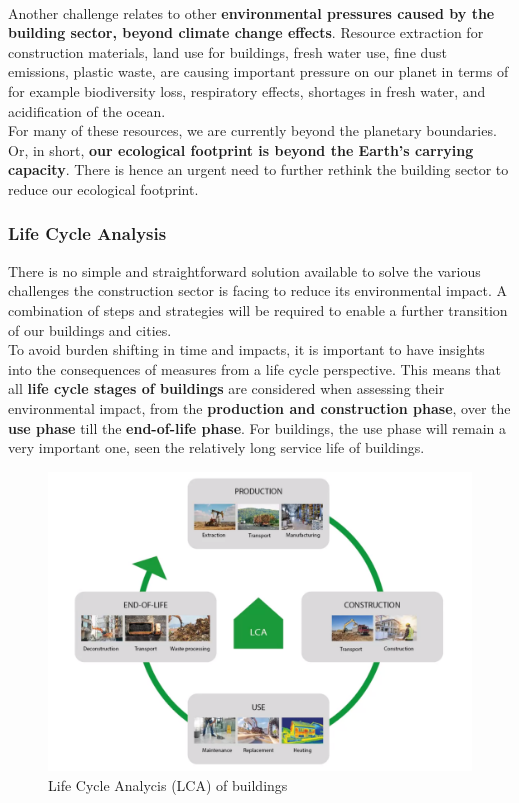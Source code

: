 \documentclass[../summary.tex]{subfiles}
\begin{document}
	\ \\
	Another challenge relates to other \textbf{environmental pressures caused by the building sector, beyond climate change effects}. Resource extraction for construction materials, land use for buildings, fresh water use, fine dust emissions, plastic waste, are causing important pressure on our planet in terms of for example biodiversity loss, respiratory effects, shortages in fresh water, and acidification of the ocean. 
	\\
	For many of these resources, we are currently beyond the planetary boundaries. Or, in short, \textbf{our ecological footprint is beyond the Earth’s carrying capacity}. There is hence an urgent need to further rethink the building sector to reduce our ecological footprint. 
	
	\subsubsection{Life Cycle Analysis}
	
	There is no simple and straightforward solution available to solve the various challenges the construction sector is facing to reduce its environmental impact. A combination of steps and strategies will be required to enable a further transition of our buildings and cities.
	\\
	To avoid burden shifting in time and impacts, it is important to have insights into the consequences of measures from a life cycle perspective. This means that all \textbf{life cycle stages of buildings} are considered when assessing their environmental impact, from the \textbf{production and construction phase}, over the \textbf{use phase} till the \textbf{end-of-life phase}. For buildings, the use phase will remain a very important one, seen the relatively long service life of buildings.
	
	\begin{figure}[H]
		\centering
		\includegraphics[width=0.69\linewidth]{../images/8-LCA}
		\caption{Life Cycle Analycis (LCA) of buildings}
		\label{fig:8-lca}
	\end{figure}
	
\end{document}
